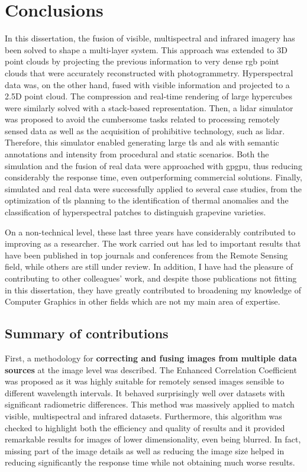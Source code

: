 \setchapterpreamble[u]{\margintoc}
\chapter{Conclusions}
\label{sec:conclusions}

In this dissertation, the fusion of visible, multispectral and infrared imagery has been solved to shape a multi-layer system. This approach was extended to 3D point clouds by projecting the previous information to very dense \acrshort{rgb} point clouds that were accurately reconstructed with photogrammetry. Hyperspectral data was, on the other hand, fused with visible information and projected to a 2.5D point cloud. The compression and real-time rendering of large hypercubes were similarly solved with a stack-based representation. Then, a \acrshort{lidar} simulator was proposed to avoid the cumbersome tasks related to processing remotely sensed data as well as the acquisition of prohibitive technology, such as \acrshort{lidar}. Therefore, this simulator enabled generating large \acrshort{tls} and \acrshort{als} with semantic annotations and intensity from procedural and static scenarios. Both the simulation and the fusion of real data were approached with \acrshort{gpgpu}, thus reducing considerably the response time, even outperforming commercial solutions. Finally, simulated and real data were successfully applied to several case studies, from the optimization of \acrshort{tls} planning to the identification of thermal anomalies and the classification of hyperspectral patches to distinguish grapevine varieties.

On a non-technical level, these last three years have considerably contributed to improving as a researcher. The work carried out has led to important results that have been published in top journals and conferences from the Remote Sensing field, while others are still under review. In addition, I have had the pleasure of contributing to other colleagues' work, and despite those publications not fitting in this dissertation, they have greatly contributed to broadening my knowledge of Computer Graphics in other fields which are not my main area of expertise. 

\section{Summary of contributions}

First, a methodology for \textbf{correcting and fusing images from multiple data sources} at the image level was described. The Enhanced Correlation Coefficient was proposed as it was highly suitable for remotely sensed images sensible to different wavelength intervals. It behaved surprisingly well over datasets with significant radiometric differences. This method was massively applied to match visible, multispectral and infrared datasets. Furthermore, this algorithm was checked to highlight both the efficiency and quality of results and it provided remarkable results for images of lower dimensionality, even being blurred. In fact, missing part of the image details as well as reducing the image size helped in reducing significantly the response time while not obtaining much worse results. 

